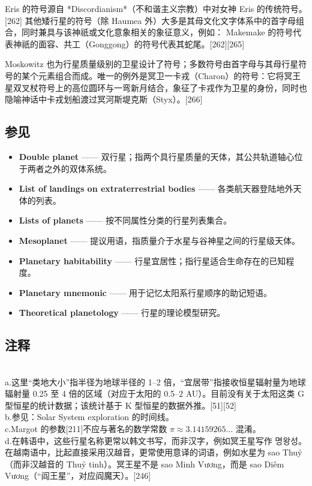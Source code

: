 Eris 的符号源自 *Discordianism*（不和谐主义宗教）中对女神 Eris 的传统符号。[262]
其他矮行星的符号（除 Haumea 外）大多是其母文化文字体系中的首字母组合，同时兼具与该神祇或文化意象相关的象征意义，例如：
Makemake 的符号代表神祇的面容、共工（Gonggong）的符号代表其蛇尾。[262][265]

Moskowitz 也为行星质量级别的卫星设计了符号；多数符号由首字母与其母行星符号的某个元素组合而成。唯一的例外是冥卫一卡戎（Charon）的符号：它将冥王星双叉杖符号上的高位圆环与一弯新月结合，象征了卡戎作为卫星的身份，同时也隐喻神话中卡戎划船渡过冥河斯堤克斯（Styx）。[266]
\subsection{参见}
\begin{itemize}
\item \textbf{Double planet} —— 双行星；指两个具行星质量的天体，其公共轨道轴心位于两者之外的双体系统。
\item \textbf{List of landings on extraterrestrial bodies} —— 各类航天器登陆地外天体的列表。
\item \textbf{Lists of planets} —— 按不同属性分类的行星列表集合。
\item \textbf{Mesoplanet} —— 提议用语，指质量介于水星与谷神星之间的行星级天体。
\item \textbf{Planetary habitability} —— 行星宜居性；指行星适合生命存在的已知程度。
\item \textbf{Planetary mnemonic} —— 用于记忆太阳系行星顺序的助记短语。
\item \textbf{Theoretical planetology} —— 行星的理论模型研究。
\end{itemize}
\subsection{注释}\\
a.这里“类地大小”指半径为地球半径的 1–2 倍，“宜居带”指接收恒星辐射量为地球辐射量 0.25 至 4 倍的区域（对应于太阳的 0.5–2 AU）。目前没有关于太阳这类 G 型恒星的统计数据；该统计基于 K 型恒星的数据外推。[51][52]\\
b.参见：Solar System exploration 的时间线。\\
c.Margot 的参数[211]不应与著名的数学常数 $\pi\approx 3.14159265\ldots$ 混淆。\\
d.在韩语中，这些行星名称更常以韩文书写，而非汉字，例如冥王星写作 명왕성。在越南语中，比起直接采用汉越音，更常使用意译的词语，例如水星为 sao Thuỷ（而非汉越音的 Thuỷ tinh）。冥王星不是 sao Minh Vương，而是 sao Diêm Vương（“阎王星”，对应阎魔天）。[246]
